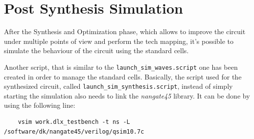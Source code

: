 \section{Post Synthesis Simulation}
After the Synthesis and Optimization phase, which allows to improve the circuit under multiple points of view and perform the tech mapping, it's possible to simulate the behaviour of the circuit using the standard cells.

Another script, that is similar to the \texttt{launch\_sim\_waves.script} one has been created in order to manage the standard cells. Basically, the script used for the synthesized circuit, called \texttt{launch\_sim\_synthesis.script}, instead of simply starting the simulation also needs to link the \textit{nangate45} library. It can be done by using the following line:
\begin{lstlisting}
	vsim work.dlx_testbench -t ns -L /software/dk/nangate45/verilog/qsim10.7c 
\end{lstlisting}
